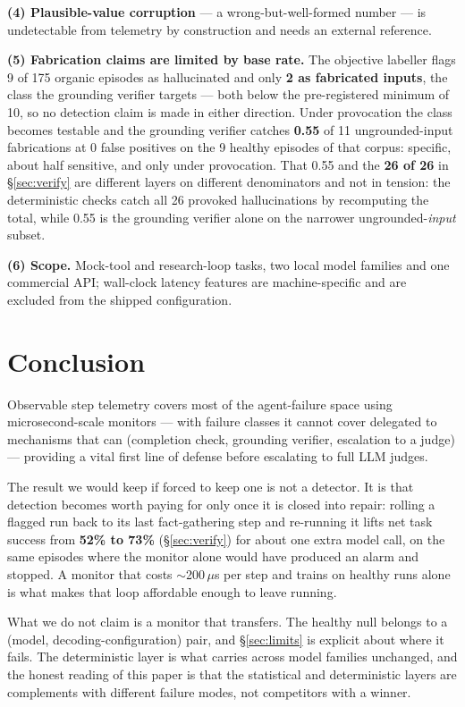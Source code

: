 \documentclass{article}
\begin{document}
\textbf{(4) Plausible-value corruption} --- a wrong-but-well-formed number ---
is undetectable from telemetry by construction and needs an external reference.

\textbf{(5) Fabrication claims are limited by base rate.} The objective
labeller flags 9 of 175 organic episodes as hallucinated and only \textbf{2 as
fabricated inputs}, the class the grounding verifier targets --- both below the
pre-registered minimum of 10, so no detection claim is made in either
direction. Under provocation the class becomes testable and the grounding verifier
catches \textbf{0.55} of 11 ungrounded-input fabrications at 0 false positives
on the 9 healthy episodes of that corpus: specific, about half sensitive, and
only under provocation.
That 0.55 and the \textbf{26 of 26} in \S\ref{sec:verify} are different layers
on different denominators and not in tension: the deterministic checks catch
all 26 provoked hallucinations by recomputing the total, while 0.55 is the
grounding verifier alone on the narrower ungrounded-\emph{input} subset.

\textbf{(6) Scope.} Mock-tool and research-loop tasks, two local model families
and one commercial API; wall-clock latency features are machine-specific and
are excluded from the shipped configuration.

\section{Conclusion}
\label{sec:conclusion}

Observable step telemetry covers most of the agent-failure space using
microsecond-scale monitors --- with failure classes it cannot cover delegated to
mechanisms that can (completion check, grounding verifier, escalation to a
judge) --- providing a vital first line of defense before escalating to full LLM
judges.

The result we would keep if forced to keep one is not a detector. It is that
detection becomes worth paying for only once it is closed into repair: rolling a
flagged run back to its last fact-gathering step and re-running it lifts net task
success from \textbf{52\% to 73\%} (\S\ref{sec:verify}) for about one extra model
call, on the same episodes where the monitor alone would have produced an alarm
and stopped. A monitor that costs $\sim$200\,$\mu$s per step and trains on healthy
runs alone is what makes that loop affordable enough to leave running.

What we do not claim is a monitor that transfers. The healthy null belongs to a
(model, decoding-configuration) pair, and \S\ref{sec:limits} is explicit about
where it fails. The deterministic layer is what carries across model families
unchanged, and the honest reading of this paper is that the statistical and
deterministic layers are complements with different failure modes, not
competitors with a winner.
\end{document}

